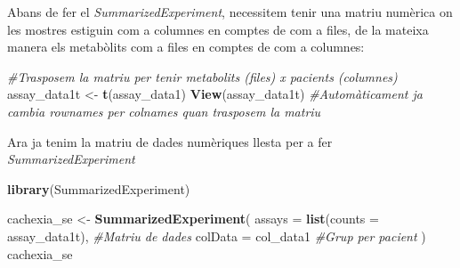 \documentclass[
]{article}
\newenvironment{Shaded}{\begin{snugshade}}{\end{snugshade}}
\newcommand{\AttributeTok}[1]{\textcolor[rgb]{0.13,0.29,0.53}{#1}}
\newcommand{\CommentTok}[1]{\textcolor[rgb]{0.56,0.35,0.01}{\textit{#1}}}
\newcommand{\FunctionTok}[1]{\textcolor[rgb]{0.13,0.29,0.53}{\textbf{#1}}}
\newcommand{\NormalTok}[1]{#1}
\newcommand{\OtherTok}[1]{\textcolor[rgb]{0.56,0.35,0.01}{#1}}
\newcommand{\SpecialCharTok}[1]{\textcolor[rgb]{0.81,0.36,0.00}{\textbf{#1}}}
\begin{document}
\begin{Shaded}
\end{Shaded}

Abans de fer el \emph{SummarizedExperiment}, necessitem tenir una matriu
numèrica on les mostres estiguin com a columnes en comptes de com a
files, de la mateixa manera els metabòlits com a files en comptes de com
a columnes:

\begin{Shaded}
\begin{Highlighting}[]
\CommentTok{\#Trasposem la matriu per tenir metabolits (files) x pacients (columnes)}
\NormalTok{assay\_data1t }\OtherTok{\textless{}{-}} \FunctionTok{t}\NormalTok{(assay\_data1)}
\FunctionTok{View}\NormalTok{(assay\_data1t) }\CommentTok{\#Automàticament ja cambia rownames per colnames quan trasposem la matriu}
\end{Highlighting}
\end{Shaded}

Ara ja tenim la matriu de dades numèriques llesta per a fer
\emph{SummarizedExperiment}

\begin{Shaded}
\begin{Highlighting}[]
\FunctionTok{library}\NormalTok{(SummarizedExperiment)}
\end{Highlighting}
\end{Shaded}

\begin{Shaded}
\begin{Highlighting}[]
\NormalTok{cachexia\_se }\OtherTok{\textless{}{-}} \FunctionTok{SummarizedExperiment}\NormalTok{(}
  \AttributeTok{assays =} \FunctionTok{list}\NormalTok{(}\AttributeTok{counts =}\NormalTok{ assay\_data1t), }\CommentTok{\#Matriu de dades }
  \AttributeTok{colData =}\NormalTok{ col\_data1 }\CommentTok{\#Grup per pacient}
\NormalTok{)}
\NormalTok{cachexia\_se}
\end{Highlighting}
\end{Shaded}
\end{document}
